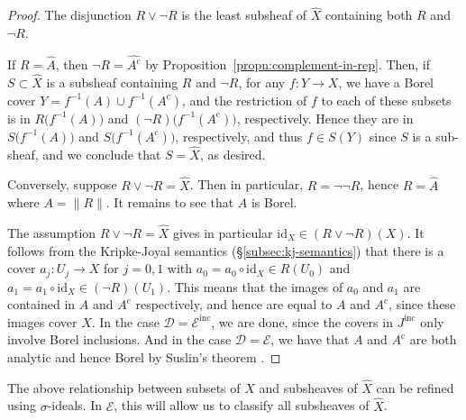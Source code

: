 \documentclass[11pt]{amsart}
\newcommand\cD{\mathcal{D}}
\newcommand\cE{\mathcal{E}}
\newcommand\cm{\mathrm{c}}
\newcommand\I{^{-1}}
\newcommand\id{\mathrm{id}}
\newcommand\inc{\mathrm{inc}}
\newcommand\norm[2][]{#1\lVert{#2}#1\rVert}
\newcommand\pbig[1]{\big({#1}\big)}
\newcommand\wh[1]{\widehat{#1}}
\theoremstyle{definition}
\theoremstyle{remark}
\theoremstyle{plain}
\begin{document}
\begin{proof}
  The disjunction \( R \vee \neg R \) is the least subsheaf of \( \wh X \) containing both \( R \) and \( \neg R \).

  If \( R = \wh{A} \), then \( \neg R = \wh{A^\cm} \) by Proposition~\ref{propn:complement-in-rep}.
  Then, if \( S \subset \wh X \) is a subsheaf containing \( R \) and \( \neg R \), for any \( f \colon Y \to X \), we have a Borel cover \( Y = f\I(A) \cup f\I(A^\cm) \), and the restriction of \( f \) to each of these subsets is in \( R\pbig{f\I(A)} \) and \( (\neg R)\pbig{f\I(A^\cm)} \), respectively.
  Hence they are in \( S\pbig{f\I(A)} \) and \( S\pbig{f\I(A^\cm)} \), respectively, and thus \( f \in S(Y) \) since \( S \) is a sub-sheaf, and we conclude that \( S = \wh X \), as desired.

  Conversely, suppose \( R \vee \neg R = \wh X \).
  Then in particular, \( R = \neg \neg R \), hence \( R = \wh{A} \) where \( A = \norm{R} \).
  It remains to see that \( A \) is Borel.

  The assumption \( R \vee \neg R = \wh X \) gives in particular \( \id_X \in (R \vee \neg R) (X) \).
  It follows from the Kripke-Joyal semantics (\S\ref{subsec:kj-semantics}) that there is a cover \( a_j \colon U_j \to X \) for \( j = 0,1 \) with \( a_0 = a_0 \circ \id_X \in R(U_0) \) and \( a_1 = a_1 \circ \id _X \in (\neg R)(U_1) \).
  This means that the images of \( a_0 \) and \( a_1 \) are contained in \( A \) and \( A^\cm \) respectively, and hence are equal to \( A \) and \( A^\cm \), since these images cover \( X \).
  In the case \( \cD = \cE^{\inc} \), we are done, since the covers in \( J^\inc \) only involve Borel inclusions.
  And in the case \( \cD = \cE \), we have that \( A \) and \( A^\cm \) are both analytic and hence Borel by Suslin's theorem \cite[Theorem~14.11]{kechris-classical}.
\end{proof}

The above relationship between subsets of \( X \) and subsheaves of \( \wh X \) can be refined using \( \sigma \)-ideals.
In \( \cE \), this will allow us to classify all subsheaves of \( \wh X \).
\end{document}
